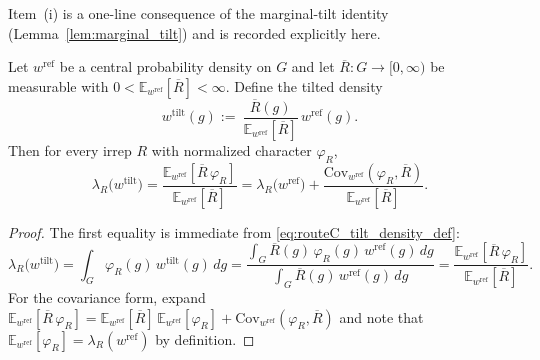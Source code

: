 \medskip
\noindent
Item~(i) is a one-line consequence of the marginal-tilt identity (Lemma~\ref{lem:marginal_tilt}) and is recorded explicitly here.

\begin{lemma}\label{lem:routeC_coeff_shift_identity}
Let $w^{\mathrm{ref}}$ be a central probability density on $G$ and let $\overline R:G\to[0,\infty)$ be measurable with
$0<\mathbb E_{w^{\mathrm{ref}}}[\overline R]<\infty$.
Define the tilted density
\begin{equation}\label{eq:routeC_tilt_density_def}
w^{\mathrm{tilt}}(g)
 :=\ 
\frac{\overline R(g)}{\mathbb E_{w^{\mathrm{ref}}}[\overline R]}\,w^{\mathrm{ref}}(g).
\end{equation}
Then for every irrep $R$ with normalized character $\varphi_R$,
\begin{equation}\label{eq:routeC_coeff_shift}
\lambda_R\bigl(w^{\mathrm{tilt}}\bigr)
=\frac{\mathbb E_{w^{\mathrm{ref}}}[\overline R\,\varphi_R]}{\mathbb E_{w^{\mathrm{ref}}}[\overline R]}
=\lambda_R\bigl(w^{\mathrm{ref}}\bigr)
+\frac{\mathrm{Cov}_{w^{\mathrm{ref}}}(\varphi_R,\overline R)}{\mathbb E_{w^{\mathrm{ref}}}[\overline R]}.
\end{equation}
\end{lemma}

\begin{proof}
The first equality is immediate from \eqref{eq:routeC_tilt_density_def}:
\[
\lambda_R\bigl(w^{\mathrm{tilt}}\bigr)
=\int_G \varphi_R(g)\,w^{\mathrm{tilt}}(g)\,dg
=\frac{\int_G \overline R(g)\,\varphi_R(g)\,w^{\mathrm{ref}}(g)\,dg}{\int_G \overline R(g)\,w^{\mathrm{ref}}(g)\,dg}
=\frac{\mathbb E_{w^{\mathrm{ref}}}[\overline R\,\varphi_R]}{\mathbb E_{w^{\mathrm{ref}}}[\overline R]}.
\]
For the covariance form, expand
$\mathbb E_{w^{\mathrm{ref}}}[\overline R\,\varphi_R]=\mathbb E_{w^{\mathrm{ref}}}[\overline R]\,\mathbb E_{w^{\mathrm{ref}}}[\varphi_R]+\mathrm{Cov}_{w^{\mathrm{ref}}}(\varphi_R,\overline R)$
and note that $\mathbb E_{w^{\mathrm{ref}}}[\varphi_R]=\lambda_R(w^{\mathrm{ref}})$ by definition.
\end{proof}

